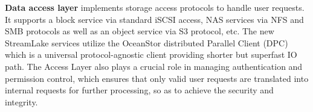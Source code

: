 



\noindent \textbf{Data access layer} implements storage access protocols to handle user requests. It supports a block service via standard iSCSI access, NAS services via NFS and SMB protocols as well as an object service via S3 protocol, etc.
The new StreamLake services utilize the OceanStor distributed Parallel Client (DPC) which is a universal protocol-agnostic client providing shorter but superfast IO path. 
The Access Layer also plays a crucial role in managing authentication and  permission control, which ensures that only valid user requests are translated into internal requests for further processing, so as to achieve  the security and integrity.
 
 

 
 
 
 
 
 